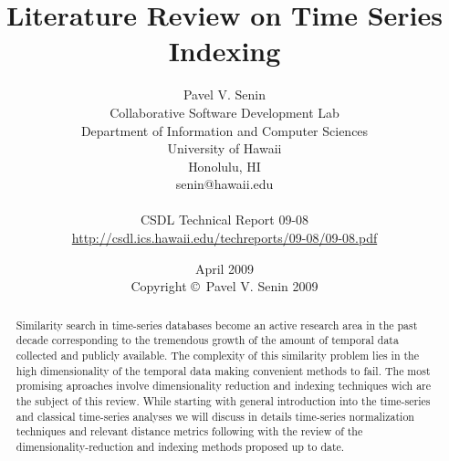 \documentclass[11pt,oneside]{report}
\numberwithin{equation}{subsection}
\begin{document}
\title{Literature Review on Time Series Indexing}
\author{Pavel V. Senin \\
Collaborative Software Development Lab \\
Department of Information and Computer Sciences \\
University of Hawaii \\
Honolulu, HI \\
senin@hawaii.edu \\
\\
CSDL Technical Report 09-08 \\
\url{http://csdl.ics.hawaii.edu/techreports/09-08/09-08.pdf}
}
\date{April 2009\\[3pt]
Copyright \copyright\ Pavel V. Senin 2009}

\maketitle

\tableofcontents

\begin{abstract}
Similarity search in time-series databases become an active research area in the past decade corresponding to the tremendous growth of the amount of temporal data collected and publicly available. The complexity of this similarity problem lies in the high dimensionality of the temporal data making convenient methods to fail. The most promising aproaches involve dimensionality reduction and indexing techniques wich are the subject of this review. While starting with general introduction into the time-series and classical time-series analyses we will discuss in details time-series normalization techniques and relevant distance metrics following with the review of the dimensionality-reduction and indexing methods proposed up to date.
\end{abstract}















	





%
%
\end{document}
